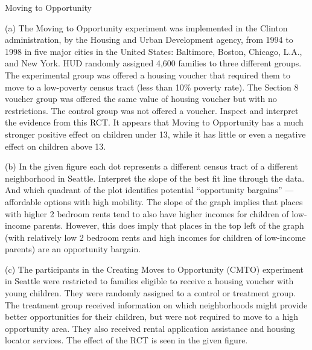 \documentclass[10pt]{extarticle}
\begin{document}
  \begin{problem}{Moving to Opportunity}
    \begin{problem}{(a)}
      The Moving to Opportunity experiment was implemented in the Clinton administration, by the Housing and Urban Development agency, from 1994 to 1998 in five major cities in the United States: Baltimore, Boston, Chicago, L.A., and New York. HUD randomly assigned 4,600 families to three different groups. The experimental group was offered a housing voucher that required them to move to a low-poverty census tract (less than 10\% poverty rate). The Section 8 voucher group was offered the same value of housing voucher but with no restrictions. The control group was not offered a voucher. Inspect and interpret the evidence from this RCT.
      \tcblower
      It appears that Moving to Opportunity has a much stronger positive effect on children under 13, while it has little or even a negative effect on children above 13.
    \end{problem}
    \begin{problem}{(b)}
      In the given figure each dot represents a different census tract of a different neighborhood in Seattle. Interpret the slope of the best fit line through the data. And which quadrant of the plot identifies potential ``opportunity bargains'' --- affordable options with high mobility.
      \tcblower
      The slope of the graph implies that places with higher 2 bedroom rents tend to also have higher incomes for children of low-income parents. However, this does imply that places in the top left of the graph (with relatively low 2 bedroom rents and high incomes for children of low-income parents) are an opportunity bargain.
    \end{problem}
    \begin{problem}{(c)}
      The participants in the Creating Moves to Opportunity (CMTO) experiment in Seattle were restricted to families eligible to receive a housing voucher with young children. They were randomly assigned to a control or treatment group. The treatment group received information on which neighborhoods might provide better opportunities for their children, but were not required to move to a high opportunity area. They also received rental application assistance and housing locator services. The effect of the RCT is seen in the given figure.\\


\end{problem}
\end{problem}
\end{document}
